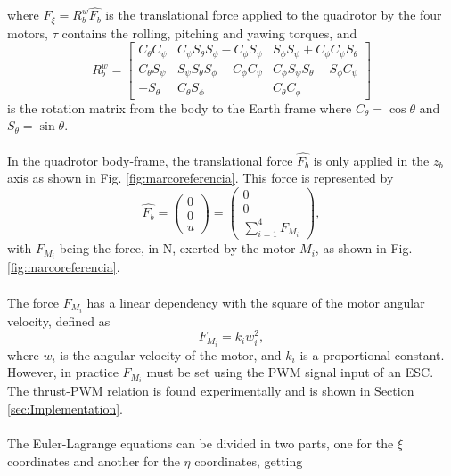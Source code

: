 where $F_{\xi}=R_{b}^{w}\hat{F_{b}}$ is the translational force applied to the quadrotor by the four motors, $\tau$ contains the rolling, pitching and yawing torques, and 
\begin{equation}
R_{b}^{w} = \begin{bmatrix}
C_\theta C_\psi & C_\psi S_\theta S_\phi-C_\phi S_\psi & S_\phi S_\psi+C_\phi C_\psi S_\theta\\
C_\theta S_\psi & S_\psi S_\theta S_\phi+C_\phi C_\psi & C_\phi S_\psi S_\theta - S_\phi C_\psi\\
-S_\theta & C_\theta S_\phi & C_\theta C_\phi
\end{bmatrix}
\end{equation}
is the rotation matrix from the body to the Earth frame where $C_\theta = \cos\theta$ and $S_\theta = \sin\theta$.
\\\\
In the quadrotor body-frame, the translational force $\hat{F_{b}}$ is only applied in the $z_{b}$ axis as shown in Fig. \ref{fig:marcoreferencia}. This force is represented by
\begin{equation}
	\hat{F_{b}}=\begin{pmatrix}
	0\\
	0\\
	u
	\end{pmatrix} = \begin{pmatrix}
	0\\
	0\\
	\sum_{i=1}^{4}F_{M_i}
	\end{pmatrix}  ,
 \label{ec:fuerzas}
 \end{equation} 
with $ F_{M_i} $ being the force, in N, exerted by the motor $ M_{i}$, as shown in Fig. \ref{fig:marcoreferencia}.
\\\\
The force $ F_{M_i} $ has a linear dependency with the square of the motor angular velocity, defined as
\begin{equation}
	F_{M_i}=k_{i}w_{i}^{2},
	\label{ec:fi}
\end{equation}
where $ w_{i} $ is the angular velocity of the motor, and $ k_{i} $ is a proportional constant. However, in practice $F_{M_i}$ must be set using the PWM signal input of an ESC. The thrust-PWM relation is found experimentally and is shown in Section \ref{sec:Implementation}.
\\\\
The Euler-Lagrange equations can be divided in two parts, one for the $\xi$ coordinates and another for the $\eta$ coordinates, getting
